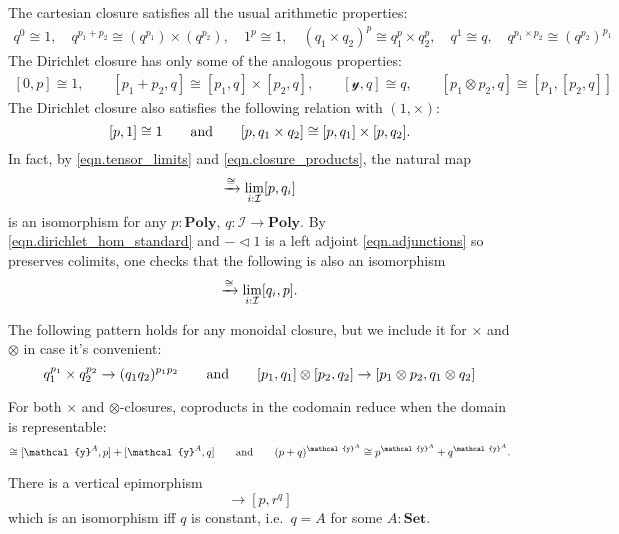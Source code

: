 \documentclass[11pt, one side, article]{memoir}
\theoremstyle{definition}
\theoremstyle{plain}
\DeclareMathOperator*{\colim}{colim}
\newcommand{\cat}[1]{\mathcal{#1}}%
\newcommand{\Cat}[1]{\mathbf{#1}}%
\newcommand{\To}[2][]{\xrightarrow[#1]{\tn{$#2$}}}
\newcommand{\tn}[1]{\textnormal{#1}}
\newcommand{\smset}{\Cat{Set}}
\newcommand{\yon}{{\mathcal{y}}}
\newcommand{\poly}{\Cat{Poly}}
\newcommand{\0}{\textsf{0}}
\newcommand{\1}{\tn{\textsf{1}}}
\newcommand{\tri}{\mathbin{\triangleleft}}
\newcommand{\hh}[2][]{#1 \tn{#2} #1}
\newcommand{\qqand}{\hh[\qquad]{and}}
\begin{document}
The cartesian closure satisfies all the usual arithmetic properties:
\begin{gather}\label{eqn.timeshom_properties}
	q^0\cong1,\quad
	q^{p_1+p_2}\cong (q^{p_1})\times(q^{p_2}),\quad
	1^p\cong 1,\quad
	(q_1\times q_2)^p\cong q_1^p\times q_2^p,\quad
	q^1\cong q,\quad
	q^{p_1\times p_2}\cong (q^{p_2})^{p_1}
\end{gather}
The Dirichlet closure has only some of the analogous properties:
\begin{gather}\label{eqn.dirhom_properties}
	[0,p]\cong1,\qquad
	[p_1+p_2,q]\cong [p_1,q]\times[p_2,q],\qquad
	[\yon,q]\cong q,\qquad
	[p_1\otimes p_2,q]\cong[p_1,[p_2,q]]
\end{gather}
The Dirichlet closure also satisfies the following relation with $(1,\times)$:
\begin{equation}\label{eqn.closure_products}
  [p,1]\cong 1
  \qqand
  [p,q_1\times q_2]\cong[p,q_1]\times[p,q_2].
\end{equation}
In fact, by \eqref{eqn.tensor_limits} and \eqref{eqn.closure_products}, the natural map
\begin{equation}
	[p,\lim_{i:\cat{I}}q_i]\To{\cong}\lim_{i:\cat{I}}[p,q_i]
\end{equation}
is an isomorphism for any $p:\poly$, $q\colon\cat{I}\to\poly$. By \eqref{eqn.dirichlet_hom_standard} and $-\tri 1$ is a left adjoint \eqref{eqn.adjunctions} so preserves colimits, one checks that the following is also an isomorphism
\begin{equation}
	[\colim_{i:\cat{I}}q_i,p]\To{\cong}\lim_{i:\cat{I}}[q_i,p].
\end{equation}

The following pattern holds for any monoidal closure, but we include it for $\times$ and $\otimes$ in case it's convenient:
\begin{equation}
	q_1^{p_1}\times q_2^{p_2}\to (q_1q_2)^{p_1p_2}
	\qqand
	[p_1,q_1]\otimes[p_2,q_2]\to[p_1\otimes p_2,q_1\otimes q_2]
\end{equation}

For both $\times$ and $\otimes$-closures, coproducts in the codomain reduce when the domain is representable:
\begin{equation}
	[\yon^A,p+q]\cong[\yon^A,p]+[\yon^A,q]
	\qqand
	(p+q)^{\yon^A}\cong p^{\yon^A}+q^{\yon^A}.
\end{equation}

There is a vertical epimorphism
\begin{equation}
	[p\times q,r]\to[p,r^q]
\end{equation}
which is an isomorphism iff $q$ is constant, i.e.\ $q=A$ for some $A:\smset$.
\end{document}
